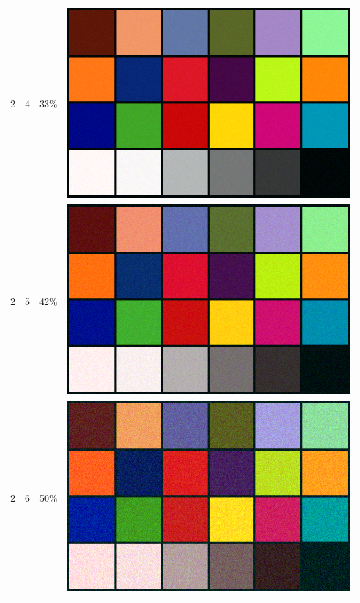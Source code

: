 \documentclass[times, utf8, seminar, numeric]{fer}
\begin{document}
\begin{center}
\begin{longtable}{|c|c|c|c|}
2 & 4 &33\% & \includegraphics[scale=0.3]{../benchmark_results/color_chart/2_components-4_bits.png} \\
2 & 5 &42\% & \includegraphics[scale=0.3]{../benchmark_results/color_chart/2_components-5_bits.png} \\
2 & 6 &50\% & \includegraphics[scale=0.3]{../benchmark_results/color_chart/2_components-6_bits.png} \\

\end{longtable}
\end{center}
\end{document}
